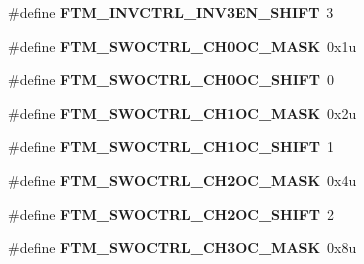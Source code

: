 \begin{DoxyCompactItemize}
\item 
\hypertarget{group___f_t_m___register___masks_gaeaa778d3ec63bd86c6a5e840eebfcbe7}{}\#define {\bfseries F\+T\+M\+\_\+\+I\+N\+V\+C\+T\+R\+L\+\_\+\+I\+N\+V3\+E\+N\+\_\+\+S\+H\+I\+F\+T}~3\label{group___f_t_m___register___masks_gaeaa778d3ec63bd86c6a5e840eebfcbe7}

\item 
\hypertarget{group___f_t_m___register___masks_ga1d6ba2b311aaea0d8857a2eff1a79f9b}{}\#define {\bfseries F\+T\+M\+\_\+\+S\+W\+O\+C\+T\+R\+L\+\_\+\+C\+H0\+O\+C\+\_\+\+M\+A\+S\+K}~0x1u\label{group___f_t_m___register___masks_ga1d6ba2b311aaea0d8857a2eff1a79f9b}

\item 
\hypertarget{group___f_t_m___register___masks_ga8a9c262029f5302d089e536c8c44b499}{}\#define {\bfseries F\+T\+M\+\_\+\+S\+W\+O\+C\+T\+R\+L\+\_\+\+C\+H0\+O\+C\+\_\+\+S\+H\+I\+F\+T}~0\label{group___f_t_m___register___masks_ga8a9c262029f5302d089e536c8c44b499}

\item 
\hypertarget{group___f_t_m___register___masks_gab033c2350b9eb73407eea7d5be5902bc}{}\#define {\bfseries F\+T\+M\+\_\+\+S\+W\+O\+C\+T\+R\+L\+\_\+\+C\+H1\+O\+C\+\_\+\+M\+A\+S\+K}~0x2u\label{group___f_t_m___register___masks_gab033c2350b9eb73407eea7d5be5902bc}

\item 
\hypertarget{group___f_t_m___register___masks_ga91d92f8443196bd3f816110707c70355}{}\#define {\bfseries F\+T\+M\+\_\+\+S\+W\+O\+C\+T\+R\+L\+\_\+\+C\+H1\+O\+C\+\_\+\+S\+H\+I\+F\+T}~1\label{group___f_t_m___register___masks_ga91d92f8443196bd3f816110707c70355}

\item 
\hypertarget{group___f_t_m___register___masks_gafb399bfe91227e3c1ef409df4f3296b9}{}\#define {\bfseries F\+T\+M\+\_\+\+S\+W\+O\+C\+T\+R\+L\+\_\+\+C\+H2\+O\+C\+\_\+\+M\+A\+S\+K}~0x4u\label{group___f_t_m___register___masks_gafb399bfe91227e3c1ef409df4f3296b9}

\item 
\hypertarget{group___f_t_m___register___masks_gabafc3c919320572e1474319804e13958}{}\#define {\bfseries F\+T\+M\+\_\+\+S\+W\+O\+C\+T\+R\+L\+\_\+\+C\+H2\+O\+C\+\_\+\+S\+H\+I\+F\+T}~2\label{group___f_t_m___register___masks_gabafc3c919320572e1474319804e13958}

\item 
\hypertarget{group___f_t_m___register___masks_ga67e490e5fc532feaba50ac976a8ba91c}{}\#define {\bfseries F\+T\+M\+\_\+\+S\+W\+O\+C\+T\+R\+L\+\_\+\+C\+H3\+O\+C\+\_\+\+M\+A\+S\+K}~0x8u\label{group___f_t_m___register___masks_ga67e490e5fc532feaba50ac976a8ba91c}


\end{DoxyCompactItemize}
